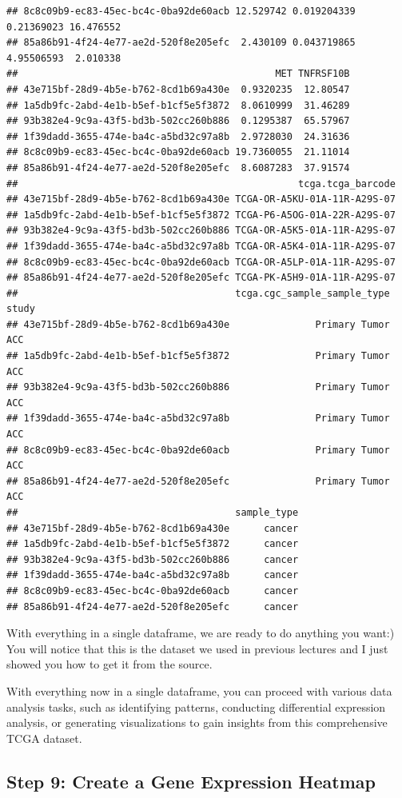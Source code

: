 \documentclass[
]{book}
\begin{document}
\begin{verbatim}
## 8c8c09b9-ec83-45ec-bc4c-0ba92de60acb 12.529742 0.019204339 0.21369023 16.476552
## 85a86b91-4f24-4e77-ae2d-520f8e205efc  2.430109 0.043719865 4.95506593  2.010338
##                                             MET TNFRSF10B
## 43e715bf-28d9-4b5e-b762-8cd1b69a430e  0.9320235  12.80547
## 1a5db9fc-2abd-4e1b-b5ef-b1cf5e5f3872  8.0610999  31.46289
## 93b382e4-9c9a-43f5-bd3b-502cc260b886  0.1295387  65.57967
## 1f39dadd-3655-474e-ba4c-a5bd32c97a8b  2.9728030  24.31636
## 8c8c09b9-ec83-45ec-bc4c-0ba92de60acb 19.7360055  21.11014
## 85a86b91-4f24-4e77-ae2d-520f8e205efc  8.6087283  37.91574
##                                                 tcga.tcga_barcode
## 43e715bf-28d9-4b5e-b762-8cd1b69a430e TCGA-OR-A5KU-01A-11R-A29S-07
## 1a5db9fc-2abd-4e1b-b5ef-b1cf5e5f3872 TCGA-P6-A5OG-01A-22R-A29S-07
## 93b382e4-9c9a-43f5-bd3b-502cc260b886 TCGA-OR-A5K5-01A-11R-A29S-07
## 1f39dadd-3655-474e-ba4c-a5bd32c97a8b TCGA-OR-A5K4-01A-11R-A29S-07
## 8c8c09b9-ec83-45ec-bc4c-0ba92de60acb TCGA-OR-A5LP-01A-11R-A29S-07
## 85a86b91-4f24-4e77-ae2d-520f8e205efc TCGA-PK-A5H9-01A-11R-A29S-07
##                                      tcga.cgc_sample_sample_type study
## 43e715bf-28d9-4b5e-b762-8cd1b69a430e               Primary Tumor   ACC
## 1a5db9fc-2abd-4e1b-b5ef-b1cf5e5f3872               Primary Tumor   ACC
## 93b382e4-9c9a-43f5-bd3b-502cc260b886               Primary Tumor   ACC
## 1f39dadd-3655-474e-ba4c-a5bd32c97a8b               Primary Tumor   ACC
## 8c8c09b9-ec83-45ec-bc4c-0ba92de60acb               Primary Tumor   ACC
## 85a86b91-4f24-4e77-ae2d-520f8e205efc               Primary Tumor   ACC
##                                      sample_type
## 43e715bf-28d9-4b5e-b762-8cd1b69a430e      cancer
## 1a5db9fc-2abd-4e1b-b5ef-b1cf5e5f3872      cancer
## 93b382e4-9c9a-43f5-bd3b-502cc260b886      cancer
## 1f39dadd-3655-474e-ba4c-a5bd32c97a8b      cancer
## 8c8c09b9-ec83-45ec-bc4c-0ba92de60acb      cancer
## 85a86b91-4f24-4e77-ae2d-520f8e205efc      cancer
\end{verbatim}

With everything in a single dataframe, we are ready to do anything you want:) You will notice that this is the dataset we used in previous lectures and I just showed you how to get it from the source.

With everything now in a single dataframe, you can proceed with various data analysis tasks, such as identifying patterns, conducting differential expression analysis, or generating visualizations to gain insights from this comprehensive TCGA dataset.

\hypertarget{step-9-create-a-gene-expression-heatmap}{%
\subsection{Step 9: Create a Gene Expression Heatmap}\label{step-9-create-a-gene-expression-heatmap}}
\end{document}
